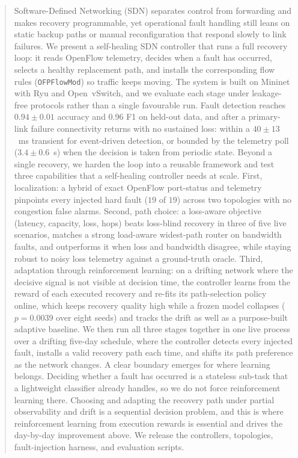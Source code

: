 \documentclass[conference]{IEEEtran}
\begin{document}
\begin{abstract}
Software-Defined Networking (SDN) separates control from forwarding and makes
recovery programmable, yet operational fault handling still leans on static backup
paths or manual reconfiguration that respond slowly to link failures. We present a
self-healing SDN controller that runs a full recovery loop: it reads OpenFlow
telemetry, decides when a fault has occurred, selects a healthy replacement path,
and installs the corresponding flow rules (\texttt{OFPFlowMod}) so traffic keeps
moving. The system is built on Mininet with Ryu and Open~vSwitch, and we evaluate
each stage under leakage-free protocols rather than a single favourable run. Fault
detection reaches $0.94\pm0.01$ accuracy and $0.96$ F1 on held-out data,
and after a primary-link failure connectivity returns with no sustained loss: within
a $40\pm13$~ms transient for event-driven detection, or bounded by the telemetry
poll ($3.4\pm0.6$~s) when the decision is taken from periodic state.
Beyond a single recovery, we harden the loop into a reusable framework and test three
capabilities that a self-healing controller needs at scale. First, localization: a
hybrid of exact OpenFlow port-status and telemetry pinpoints every injected hard
fault ($19$ of $19$) across two topologies with no congestion false alarms.
Second, path choice: a loss-aware objective (latency, capacity, loss, hops) beats
loss-blind recovery in three of five live scenarios, matches a strong load-aware
widest-path router on bandwidth faults, and outperforms it when loss and bandwidth
disagree, while staying robust to noisy loss telemetry against a ground-truth oracle.
Third, adaptation through reinforcement learning: on a drifting network where the
decisive signal is not visible at decision time, the controller learns from the reward
of each executed recovery and re-fits its path-selection policy online, which keeps
recovery quality high while a frozen model collapses ($p=0.0039$ over eight seeds) and
tracks the drift as well as a purpose-built adaptive baseline.
We then run all three stages together in one live process over a drifting five-day
schedule, where the controller detects every injected fault, installs a valid recovery
path each time, and shifts its path preference as the network changes.
A clear boundary emerges for where learning belongs. Deciding whether a fault has
occurred is a stateless sub-task that a lightweight classifier already handles, so we
do not force reinforcement learning there. Choosing and adapting the recovery path
under partial observability and drift is a sequential decision problem, and this is
where reinforcement learning from execution rewards is essential and drives the
day-by-day improvement above. We release the controllers, topologies, fault-injection
harness, and evaluation scripts.
\end{abstract}
\end{document}
